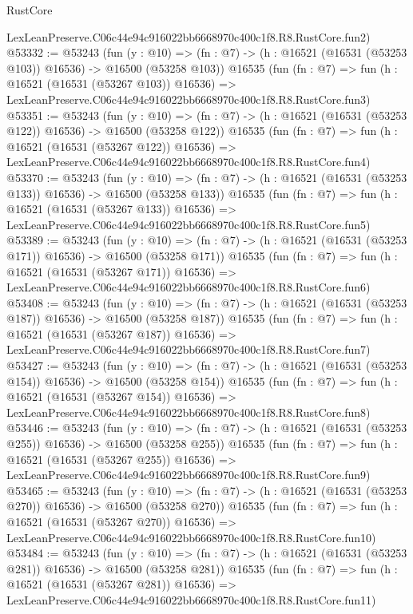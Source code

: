 \begin{lexlean}{RustCore}
\begin{coremodule}
    LexLeanPreserve.C06c44e94c916022bb6668970c400c1f8.R8.RustCore.fun2)
@53332 := @53243
    (fun (y : @10) =>
    (fn : @7) -> (h : @16521 (@16531 (@53253 @103)) @16536) -> @16500 (@53258 @103))
    @16535
    (fun (fn : @7) =>
    fun (h : @16521 (@16531 (@53267 @103)) @16536) =>
    LexLeanPreserve.C06c44e94c916022bb6668970c400c1f8.R8.RustCore.fun3)
@53351 := @53243
    (fun (y : @10) =>
    (fn : @7) -> (h : @16521 (@16531 (@53253 @122)) @16536) -> @16500 (@53258 @122))
    @16535
    (fun (fn : @7) =>
    fun (h : @16521 (@16531 (@53267 @122)) @16536) =>
    LexLeanPreserve.C06c44e94c916022bb6668970c400c1f8.R8.RustCore.fun4)
@53370 := @53243
    (fun (y : @10) =>
    (fn : @7) -> (h : @16521 (@16531 (@53253 @133)) @16536) -> @16500 (@53258 @133))
    @16535
    (fun (fn : @7) =>
    fun (h : @16521 (@16531 (@53267 @133)) @16536) =>
    LexLeanPreserve.C06c44e94c916022bb6668970c400c1f8.R8.RustCore.fun5)
@53389 := @53243
    (fun (y : @10) =>
    (fn : @7) -> (h : @16521 (@16531 (@53253 @171)) @16536) -> @16500 (@53258 @171))
    @16535
    (fun (fn : @7) =>
    fun (h : @16521 (@16531 (@53267 @171)) @16536) =>
    LexLeanPreserve.C06c44e94c916022bb6668970c400c1f8.R8.RustCore.fun6)
@53408 := @53243
    (fun (y : @10) =>
    (fn : @7) -> (h : @16521 (@16531 (@53253 @187)) @16536) -> @16500 (@53258 @187))
    @16535
    (fun (fn : @7) =>
    fun (h : @16521 (@16531 (@53267 @187)) @16536) =>
    LexLeanPreserve.C06c44e94c916022bb6668970c400c1f8.R8.RustCore.fun7)
@53427 := @53243
    (fun (y : @10) =>
    (fn : @7) -> (h : @16521 (@16531 (@53253 @154)) @16536) -> @16500 (@53258 @154))
    @16535
    (fun (fn : @7) =>
    fun (h : @16521 (@16531 (@53267 @154)) @16536) =>
    LexLeanPreserve.C06c44e94c916022bb6668970c400c1f8.R8.RustCore.fun8)
@53446 := @53243
    (fun (y : @10) =>
    (fn : @7) -> (h : @16521 (@16531 (@53253 @255)) @16536) -> @16500 (@53258 @255))
    @16535
    (fun (fn : @7) =>
    fun (h : @16521 (@16531 (@53267 @255)) @16536) =>
    LexLeanPreserve.C06c44e94c916022bb6668970c400c1f8.R8.RustCore.fun9)
@53465 := @53243
    (fun (y : @10) =>
    (fn : @7) -> (h : @16521 (@16531 (@53253 @270)) @16536) -> @16500 (@53258 @270))
    @16535
    (fun (fn : @7) =>
    fun (h : @16521 (@16531 (@53267 @270)) @16536) =>
    LexLeanPreserve.C06c44e94c916022bb6668970c400c1f8.R8.RustCore.fun10)
@53484 := @53243
    (fun (y : @10) =>
    (fn : @7) -> (h : @16521 (@16531 (@53253 @281)) @16536) -> @16500 (@53258 @281))
    @16535
    (fun (fn : @7) =>
    fun (h : @16521 (@16531 (@53267 @281)) @16536) =>
    LexLeanPreserve.C06c44e94c916022bb6668970c400c1f8.R8.RustCore.fun11)

\end{coremodule}
\end{lexlean}
